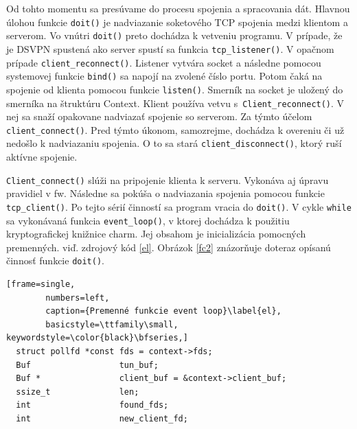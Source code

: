Od tohto momentu sa presúvame do procesu spojenia a spracovania dát. Hlavnou úlohou funkcie \lstinline|doit()| je nadviazanie soketového TCP spojenia medzi klientom a serverom. Vo vnútri \lstinline|doit()| preto dochádza k vetveniu programu. V prípade, že je DSVPN spustená ako server spustí sa funkcia \lstinline|tcp_listener()|. V opačnom prípade \lstinline|client_reconnect()|. Listener vytvára socket a následne pomocou systemovej funkcie \lstinline|bind()| sa napojí na zvolené číslo portu. Potom čaká na spojenie od klienta pomocou funkcie \lstinline|listen()|. Smerník na socket je uložený do smerníka na štruktúru Context.
Klient používa vetvu s~\lstinline|Client_reconnect()|. V nej sa snaží opakovane nadviazať spojenie so serverom. Za týmto účelom \\\lstinline|client_connect()|. Pred týmto úkonom, samozrejme, dochádza k overeniu či už nedošlo k nadviazaniu spojenia. O to sa stará \lstinline|client_disconnect()|, ktorý ruší aktívne spojenie.

\lstinline|Client_connect()| slúži na pripojenie klienta k serveru. Vykonáva aj úpravu pravidiel v \acrshort{fw}. Následne sa pokúša o nadviazania spojenia pomocou funkcie  \lstinline|tcp_client()|. Po tejto sérií činností sa program vracia do \lstinline|doit()|. V cykle \lstinline|while| sa vykonávaná funkcia \lstinline|event_loop()|, v ktorej dochádza k použitiu kryptografickej knižnice charm. Jej obsahom je inicializácia pomocných premenných. viď. zdrojový kód \ref{el}. Obrázok \ref{fc2} znázorňuje doteraz opísanú činnosť funkcie \lstinline|doit()|.
  
  \begin{minipage}{\linewidth} 	
  	\begin{lstlisting}[frame=single,
  		numbers=left,
  		caption={Premenné funkcie event loop}\label{el},
  		basicstyle=\ttfamily\small, keywordstyle=\color{black}\bfseries,]
  struct pollfd *const fds = context->fds;
  Buf                  tun_buf;
  Buf *                client_buf = &context->client_buf;
  ssize_t              len;
  int                  found_fds;
  int                  new_client_fd;
    	\end{lstlisting}
\end{minipage}\\ 
 
 

